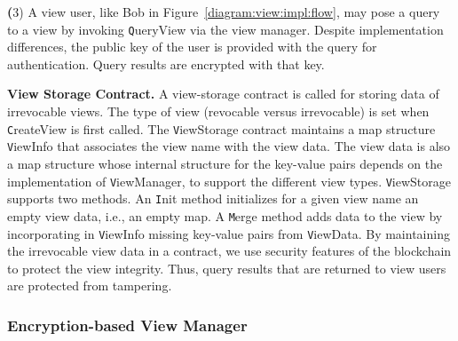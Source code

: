 \smallskip
\noindent
{\textbf (3)} A view user, like Bob in Figure~\ref{diagram:view:impl:flow}, may pose a  query to a view by invoking {\texttt QueryView} via the view manager. Despite implementation differences, the public key of the user is provided with the query for authentication. Query results are encrypted with that key. 


\smallskip
\noindent
\textbf{View Storage Contract.} A view-storage contract is called for storing data of irrevocable views. The type of view (revocable versus irrevocable) is set when {\texttt CreateView} is first called.  
The {\texttt ViewStorage} contract maintains a map structure {\texttt ViewInfo} that associates the view name with the view data. 
The view data is also a map structure whose internal structure for the key-value pairs depends on the implementation of {\texttt ViewManager}, to support the different view types. 
 {\texttt ViewStorage} supports two methods. An {\texttt Init} method initializes for a given view name an empty view data, i.e., an empty map. A {\texttt Merge} method adds data to the view by incorporating in {\texttt ViewInfo} missing key-value pairs from {\texttt ViewData}. 
By maintaining the irrevocable view data in a contract, we use security features of the blockchain to protect the view integrity. Thus, query results that are returned to view users are protected from tampering. 


\subsubsection{Encryption-based View Manager}


